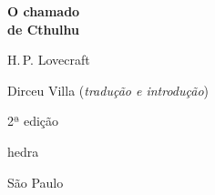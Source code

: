 





\begingroup\thispagestyle{empty}\vspace*{.05\textheight} 

              \formular
              \Huge
              \noindent
              \textbf{O chamado\\ de Cthulhu}
              
              {\brabo\LARGE
              \noindent H.\,P. Lovecraft}
              \vfill

              \newfontfamily{}
              \fontsize{30}{40}\selectfont \minion\small
              \noindent Dirceu Villa (\textit{tradução e introdução})

              \vspace{0.5cm}
              
              {\noindent\fontsize{30}{40}\selectfont \minion\small\noindent 2ª edição}

              \vfill
              
              {\noindent\fontsize{30}{40}\selectfont\timesnewroman hedra}
              \smallskip
              
              {\selectfont\minion\small
              \noindent São Paulo \quad\the\year}

\endgroup
\pagebreak
